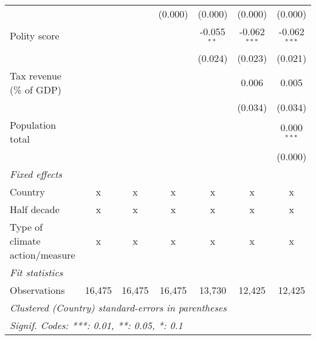 \begin{tabular}{lcccccc}
                                                                               &               &               & (0.000)       & (0.000)       & (0.000)        & (0.000)\\   
   Polity score                                                                &               &               &               & -0.055$^{**}$ & -0.062$^{***}$ & -0.062$^{***}$\\   
                                                                               &               &               &               & (0.024)       & (0.023)        & (0.021)\\   
   Tax revenue (\% of GDP)                                                     &               &               &               &               & 0.006          & 0.005\\   
                                                                               &               &               &               &               & (0.034)        & (0.034)\\   
   Population total                                                            &               &               &               &               &                & 0.000$^{***}$\\   
                                                                               &               &               &               &               &                & (0.000)\\   
   \emph{Fixed effects}\\
   Country                                                                     & x             & x             & x             & x             & x              & x\\  
   Half decade                                                                 & x             & x             & x             & x             & x              & x\\  
   Type of climate action/measure                                              & x             & x             & x             & x             & x              & x\\  
   \midrule \emph{Fit statistics}\\
   Observations                                                                & 16,475        & 16,475        & 16,475        & 13,730        & 12,425         & 12,425\\  
   \midrule
   \multicolumn{7}{l}{\emph{Clustered (Country) standard-errors in parentheses}}\\
   \multicolumn{7}{l}{\emph{Signif. Codes: ***: 0.01, **: 0.05, *: 0.1}}\\
\end{tabular}
\par\endgroup


